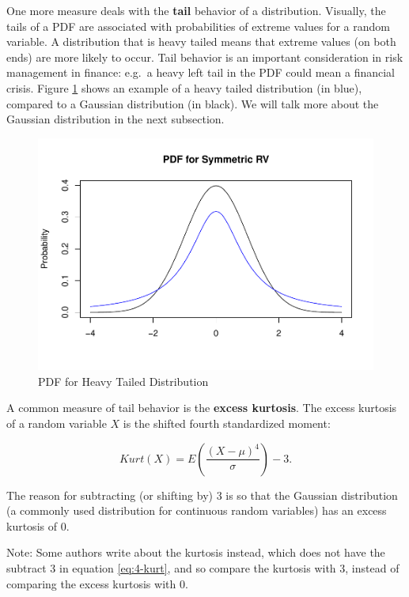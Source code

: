 \documentclass[
]{book}
\begin{document}
One more measure deals with the \textbf{tail} behavior of a distribution. Visually, the tails of a PDF are associated with probabilities of extreme values for a random variable. A distribution that is heavy tailed means that extreme values (on both ends) are more likely to occur. Tail behavior is an important consideration in risk management in finance: e.g.~a heavy left tail in the PDF could mean a financial crisis. Figure \ref{fig:4-kurt} shows an example of a heavy tailed distribution (in blue), compared to a Gaussian distribution (in black). We will talk more about the Gaussian distribution in the next subsection.

\begin{figure}
\centering
\includegraphics{bookdown-demo_files/figure-latex/4-kurt-1.pdf}
\caption{\label{fig:4-kurt}PDF for Heavy Tailed Distribution}
\end{figure}

A common measure of tail behavior is the \textbf{excess kurtosis}. The excess kurtosis of a random variable \(X\) is the shifted fourth standardized moment:

\begin{equation} 
Kurt(X) = E \left(\frac{(X-\mu)^4}{\sigma} \right) - 3.
\label{eq:4-kurt}
\end{equation}

The reason for subtracting (or shifting by) 3 is so that the Gaussian distribution (a commonly used distribution for continuous random variables) has an excess kurtosis of 0.

Note: Some authors write about the kurtosis instead, which does not have the subtract 3 in equation \eqref{eq:4-kurt}, and so compare the kurtosis with 3, instead of comparing the excess kurtosis with 0.
\end{document}
